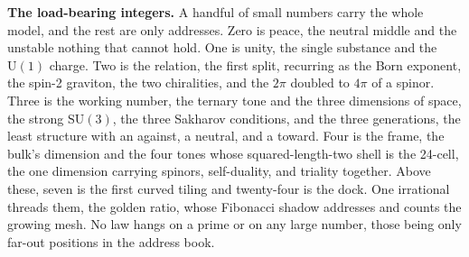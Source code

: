 \textbf{The load-bearing integers.} A handful of small numbers carry the whole model, and the rest are only addresses. Zero is peace, the neutral middle and the unstable nothing that cannot hold. One is unity, the single substance and the $\mathrm{U}(1)$ charge. Two is the relation, the first split, recurring as the Born exponent, the spin-2 graviton, the two chiralities, and the $2\pi$ doubled to $4\pi$ of a spinor. Three is the working number, the ternary tone and the three dimensions of space, the strong $\mathrm{SU}(3)$, the three Sakharov conditions, and the three generations, the least structure with an against, a neutral, and a toward. Four is the frame, the bulk's dimension and the four tones whose squared-length-two shell is the 24-cell, the one dimension carrying spinors, self-duality, and triality together. Above these, seven is the first curved tiling and twenty-four is the dock. One irrational threads them, the golden ratio, whose Fibonacci shadow addresses and counts the growing mesh. No law hangs on a prime or on any large number, those being only far-out positions in the address book.
